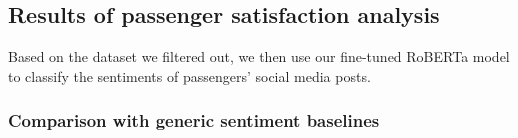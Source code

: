 \documentclass[a4paper,fleqn,12pt]{cas-sc}
\begin{document}




\subsection{Results of passenger satisfaction analysis}
Based on the dataset we filtered out, we then use our fine-tuned RoBERTa model to classify the sentiments of passengers' social media posts.


\subsubsection{Comparison with generic sentiment baselines}
\end{document}

